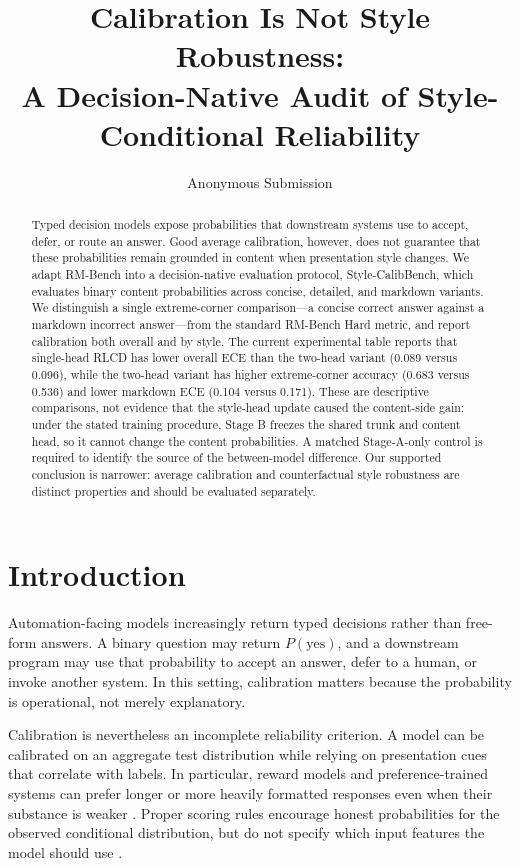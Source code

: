 \documentclass[letterpaper]{article} %
\title{Calibration Is Not Style Robustness:\\A Decision-Native Audit of Style-Conditional Reliability}
\author{Anonymous Submission}
\begin{document}
\maketitle

\begin{abstract}
Typed decision models expose probabilities that downstream systems use to accept, defer, or route an answer. Good average calibration, however, does not guarantee that these probabilities remain grounded in content when presentation style changes. We adapt RM-Bench into a decision-native evaluation protocol, Style-CalibBench, which evaluates binary content probabilities across concise, detailed, and markdown variants. We distinguish a single extreme-corner comparison---a concise correct answer against a markdown incorrect answer---from the standard RM-Bench Hard metric, and report calibration both overall and by style. The current experimental table reports that single-head RLCD has lower overall ECE than the two-head variant (0.089 versus 0.096), while the two-head variant has higher extreme-corner accuracy (0.683 versus 0.536) and lower markdown ECE (0.104 versus 0.171). These are descriptive comparisons, not evidence that the style-head update caused the content-side gain: under the stated training procedure, Stage B freezes the shared trunk and content head, so it cannot change the content probabilities. A matched Stage-A-only control is required to identify the source of the between-model difference. Our supported conclusion is narrower: average calibration and counterfactual style robustness are distinct properties and should be evaluated separately.
\end{abstract}

\section{Introduction}

Automation-facing models increasingly return typed decisions rather than free-form answers. A binary question may return $P(\mathrm{yes})$, and a downstream program may use that probability to accept an answer, defer to a human, or invoke another system. In this setting, calibration matters because the probability is operational, not merely explanatory.

Calibration is nevertheless an incomplete reliability criterion. A model can be calibrated on an aggregate test distribution while relying on presentation cues that correlate with labels. In particular, reward models and preference-trained systems can prefer longer or more heavily formatted responses even when their substance is weaker \citep{liu2025rmbench,bharadwaj2026flattery}. Proper scoring rules encourage honest probabilities for the observed conditional distribution, but do not specify which input features the model should use \citep{brier1950verification,gneiting2007scoring}.
\end{document}
